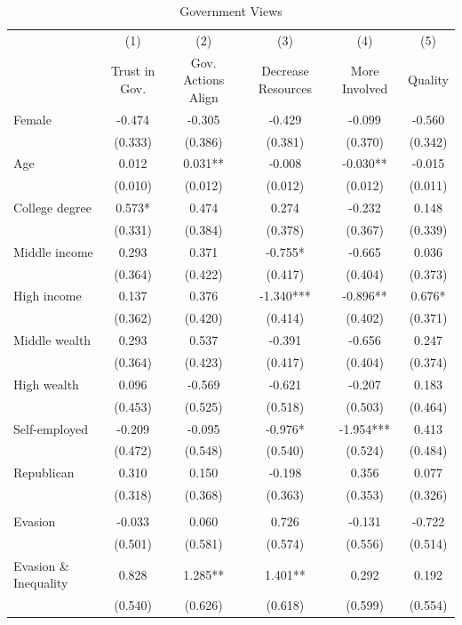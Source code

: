 \documentclass[11pt]{article}
\begin{document}
\FloatBarrier
\begin{table}[!htbp]\centering
\caption{Government Views}
\label{tab:government_views_c}
\begin{threeparttable}
\footnotesize
\begin{tabular}{l|ccccc}
\toprule
& (1) & (2) & (3) & (4) & (5) \\
& Trust in Gov. & Gov. Actions Align & Decrease Resources & More Involved & Quality \\
\midrule
Female & -0.474 & -0.305 & -0.429 & -0.099 & -0.560 \\
 & (0.333) & (0.386) & (0.381) & (0.370) & (0.342) \\
Age & 0.012 & 0.031** & -0.008 & -0.030** & -0.015 \\
 & (0.010) & (0.012) & (0.012) & (0.012) & (0.011) \\
College degree & 0.573* & 0.474 & 0.274 & -0.232 & 0.148 \\
 & (0.331) & (0.384) & (0.378) & (0.367) & (0.339) \\
Middle income & 0.293 & 0.371 & -0.755* & -0.665 & 0.036 \\
 & (0.364) & (0.422) & (0.417) & (0.404) & (0.373) \\
High income & 0.137 & 0.376 & -1.340*** & -0.896** & 0.676* \\
 & (0.362) & (0.420) & (0.414) & (0.402) & (0.371) \\
Middle wealth & 0.293 & 0.537 & -0.391 & -0.656 & 0.247 \\
 & (0.364) & (0.423) & (0.417) & (0.404) & (0.374) \\
High wealth & 0.096 & -0.569 & -0.621 & -0.207 & 0.183 \\
 & (0.453) & (0.525) & (0.518) & (0.503) & (0.464) \\
Self-employed & -0.209 & -0.095 & -0.976* & -1.954*** & 0.413 \\
 & (0.472) & (0.548) & (0.540) & (0.524) & (0.484) \\
Republican & 0.310 & 0.150 & -0.198 & 0.356 & 0.077 \\
 & (0.318) & (0.368) & (0.363) & (0.353) & (0.326) \\
\\[0.5em]
Evasion & -0.033 & 0.060 & 0.726 & -0.131 & -0.722 \\
 & (0.501) & (0.581) & (0.574) & (0.556) & (0.514) \\
Evasion \& Inequality & 0.828 & 1.285** & 1.401** & 0.292 & 0.192 \\
 & (0.540) & (0.626) & (0.618) & (0.599) & (0.554) \\

\end{tabular}
\end{threeparttable}
\end{table}
\end{document}
